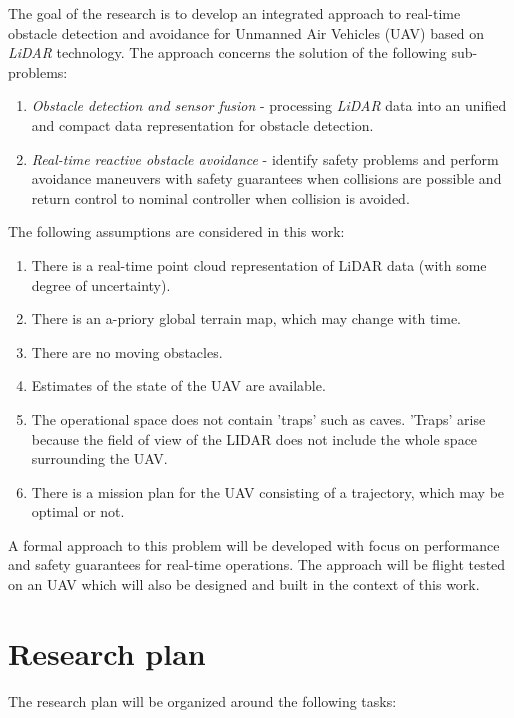 The goal of the research is to develop an integrated approach to real-time obstacle detection and avoidance for Unmanned Air Vehicles (UAV) based on \textit{LiDAR} technology. The approach concerns the solution of the following sub-problems:
\begin{enumerate}


    \item  \textit{Obstacle detection and sensor fusion} - processing \textit{LiDAR} data into an unified and compact data representation for obstacle detection. 
		
    \item  \textit{Real-time reactive obstacle avoidance} - identify safety problems and perform avoidance maneuvers with safety guarantees when collisions are possible and return control to nominal controller when collision is avoided.

\end{enumerate}


The following assumptions are considered in this work:
\begin{enumerate}
	\item There is a real-time point cloud representation of LiDAR data (with some degree of uncertainty).
	\item There is an a-priory global terrain map, which may change with time.
	\item There are no moving obstacles.
	\item Estimates of the state of the UAV are available.
	\item The operational space does not contain 'traps' such as caves. 'Traps' arise because the field of view of the LIDAR does not include the whole space surrounding the UAV.
	\item There is a mission plan for the UAV consisting of a trajectory, which may be optimal or not.
\end{enumerate}

A formal approach to this problem will be developed with focus on performance and safety guarantees for real-time operations. The approach will be flight tested on an UAV which will also be designed and built in the context of this work.


\section*{Research plan}

The research plan will be organized around the following tasks:

